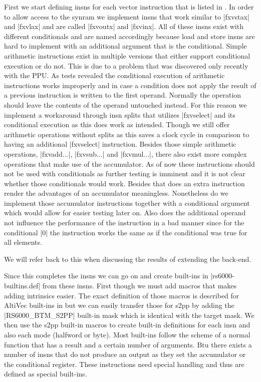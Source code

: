 First we start defining insns for each vector instruction that is listed in \cite{nuxmanual}.
In order to allow access to the synram we implement insns that work similar to |fxvstax| and |fxvlax| and are called |fxvoutx| and |fxvinx|.
All of these insns exist with different conditionals and are named accordingly because load and store insns are hard to implement with an additional argument that is the conditional.
Simple arithmetic instructions exist in multiple versions that either support conditional execution or do not.
This is due to a problem that was discovered only recently with the PPU.
As tests revealed the conditional execution of arithmetic instructions works improperly and in case a condition does not apply the result of a previous instruction is written to the first operand.
Normally the operation should leave the contents of the operand untouched instead.
For this reason we implement a workaround through insn splits that utilizes |fxvselect| and its conditional execution as this does work as intended.
Though we still offer arithmetic operations without splits as this saves a clock cycle in comparison to having an additional |fxvselect| instruction.
Besides those simple arithmetic operations, |fxvadd...|, |fxvsub...| and |fxvmul...|, there also exist more complex operations that make use of the accumulator.
As of now these instructions should not be used with conditionals as further testing is imminent and it is not clear whether those conditionals would work.
Besides that does an extra instruction render the advantages of an accumulator meaningless.
Nonetheless do we implement those accumulator instructions together with a conditional argument which would allow for easier testing later on.
Also does the additional operand not influence the performance of the instruction in a bad manner since for the conditional |0| the instruction works the same as if the conditional was true for all elements.

We will refer back to this when discussing the results of extending the back-end.

Since this completes the insns we can go on and create built-ins in |rs6000-builtins.def| from these insns.
First though we must add macros that makes adding intrinsics easier.
The exact definition of those macros is described for AltiVec built-ins in \cite{heimbrecht_2017internship} but we can easily transfer those for s2pp by adding the |RS6000_BTM_S2PP| built-in mask which is identical with the target mask.
We then use the s2pp built-in macros to create built-in definitions for each insn and also each mode (halfword or byte).
Most built-ins follow the scheme of a normal function that has a result and a certain number of arguments.
Btu there exists a number of insns that do not produce an output as they set the accumulator or the conditional register.
These instructions need special handling and thus are defined as special built-ins.

